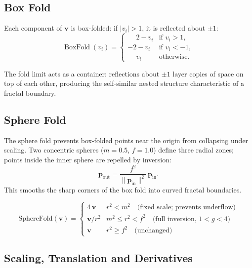 \subsection{Box Fold}

Each component of $\mathbf{v}$ is box-folded: if $|v_i| > 1$, it is reflected about
$\pm 1$:
%
\[
    \operatorname{BoxFold}(v_i) =
    \begin{cases}
        \phantom{-}2 - v_i  & \text{if } v_i > 1,  \\
        -2 - v_i             & \text{if } v_i < -1, \\
        \phantom{-}v_i       & \text{otherwise.}
    \end{cases}
\]

The fold limit acts as a container: reflections about $\pm1$ layer copies of space on top of each other, producing the self-similar nested structure characteristic of a fractal boundary.

\subsection{Sphere Fold}

The sphere fold prevents box-folded points near the origin from collapsing under scaling. Two concentric spheres ($m=0.5$, $f=1.0$) define three radial zones; points inside the inner sphere are repelled by inversion:
%
\[
    \mathbf{p}_{\text{out}} = \frac{f^{2}}{\|\mathbf{p}_{\text{in}}\|^{2}}\,\mathbf{p}_{\text{in}}.
\]
%
This smooths the sharp corners of the box fold into curved fractal boundaries.

\[
    \text{SphereFold}(\mathbf{v}) =
    \begin{cases}
        4\,\mathbf{v}                          & r^2 < m^2 \quad \text{(fixed scale; prevents underflow)} \\
        \mathbf{v}/r^2                         & m^2 \leq r^2 < f^2 \quad \text{(full inversion, } 1 < g < 4\text{)} \\
        \mathbf{v}                             & r^2 \geq f^2 \quad \text{(unchanged)}
    \end{cases}
\]

\subsection{Scaling, Translation and Derivatives}

